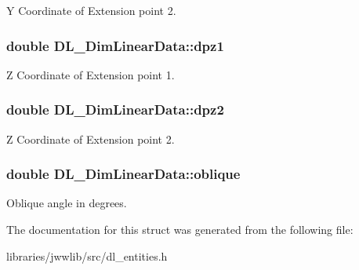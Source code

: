 Y Coordinate of Extension point 2. \hypertarget{structDL__DimLinearData_a5cb6180b0c69554d7c9667c2028761ed}{
\subsubsection[{dpz1}]{\setlength{\rightskip}{0pt plus 5cm}double D\-L\-\_\-\-Dim\-Linear\-Data\-::dpz1}}\label{structDL__DimLinearData_a5cb6180b0c69554d7c9667c2028761ed}
Z Coordinate of Extension point 1. \hypertarget{structDL__DimLinearData_ab81b7845a89710d5564753f8e155fa59}{
\subsubsection[{dpz2}]{\setlength{\rightskip}{0pt plus 5cm}double D\-L\-\_\-\-Dim\-Linear\-Data\-::dpz2}}\label{structDL__DimLinearData_ab81b7845a89710d5564753f8e155fa59}
Z Coordinate of Extension point 2. \hypertarget{structDL__DimLinearData_a337879f59b2390829374ba59658abc7d}{
\subsubsection[{oblique}]{\setlength{\rightskip}{0pt plus 5cm}double D\-L\-\_\-\-Dim\-Linear\-Data\-::oblique}}\label{structDL__DimLinearData_a337879f59b2390829374ba59658abc7d}
Oblique angle in degrees. 

The documentation for this struct was generated from the following file\-:\begin{DoxyCompactItemize}
\item 
libraries/jwwlib/src/dl\-\_\-entities.\-h\end{DoxyCompactItemize}
